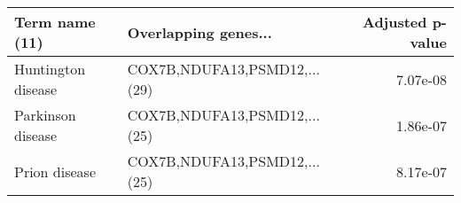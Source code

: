 \begin{tabular}{llr}
\toprule
    Term name (11) &         Overlapping genes... &  Adjusted p-value \\
\midrule
Huntington disease & COX7B,NDUFA13,PSMD12,...(29) &          7.07e-08 \\
 Parkinson disease & COX7B,NDUFA13,PSMD12,...(25) &          1.86e-07 \\
     Prion disease & COX7B,NDUFA13,PSMD12,...(25) &          8.17e-07 \\
\bottomrule
\end{tabular}
